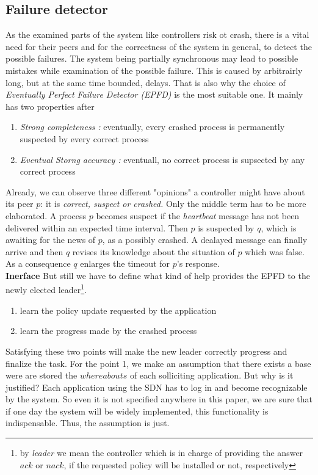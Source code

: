 \documentclass{article}
\theoremstyle{remark}
\begin{document}
\subsection{Failure detector}
As the examined parts of the system like controllers risk ot crash, there is a vital need for their peers and for the correctness of the system in general, to detect the possible failures. The system being partially synchronous may lead to possible mistakes while examination of the possible failure. This is caused by arbitrairly long, but at the same time bounded, delays.
That is also why the choice of \emph{Eventually Perfect Failure Detector (EPFD)} is the most suitable one. It mainly has two properties after \cite{Guerraoui:2010:IRD:1951643}
\begin{enumerate}
\item \emph{Strong completeness :} eventually, every crashed process is permanently suspected by every correct process
\item  \emph{Eventual Storng accuracy :} eventuall, no correct process is supsected by any correct process
\end{enumerate}
Already, we can observe three different "opinions" a controller might have about its peer $p$: it is \emph{correct, suspect or crashed.} Only the middle term has to be more elaborated. A process $p$ becomes suspect if the \emph{heartbeat} message has not been delivered within an expected time interval. Then $p$ is suspected by $q$, which is awaiting for the news of $p$, as a possibly crashed. A dealayed message can finally arrive and then $q$ revises its knowledge about the situation of $p$ which was false. As a consequence $q$ enlarges the timeout for $p$'s response.\\
\textbf{Inerface} But still we have to define what kind of help provides the EPFD to the newly elected leader\footnote{by \emph{leader} we mean the controller which is in charge of providing the answer $ack$ or $nack$, if the requested policy will be installed or not, respectively}.
\begin{enumerate}
\item learn the policy update requested by the application
\item learn the progress made by the crashed process 
\end{enumerate}
Satisfying these two points will make the new leader correctly progress and finalize the task.
For the point 1, we make an assumption that there exists a base were are stored the $whereabouts$ of each solliciting application. But why is it justified? Each application using the SDN has to log in and become recognizable by the system. So even it is not specified anywhere in this paper, we are sure that if one day the system will be widely implemented, this functionality is indispensable. Thus, the assumption is just.\\
\end{document}
